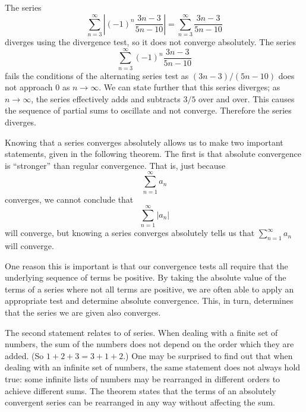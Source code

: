 \documentclass{ximera}
\begin{document}
\begin{question}
\begin{question}
\begin{question}
\begin{prompt}
\begin{selectAll}
        \end{selectAll}
        \begin{feedback}
	  The series
          \[
          \sum_{n=3}^\infty \left|(-1)^n\frac{3n-3}{5n-10}\right| =
          \sum_{n=3}^\infty \frac{3n-3}{5n-10}
          \]
          diverges using the divergence test, so it does not converge
          absolutely.  The series
          \[
          \sum_{n=3}^\infty (-1)^n\frac{3n-3}{5n-10}
          \]
          fails the conditions of the alternating series test as
          $(3n-3)/(5n-10)$ does not approach $0$ as $n\to\infty$. We
          can state further that this series diverges; as
          $n\to\infty$, the series effectively adds and subtracts
          $3/5$ over and over. This causes the sequence of partial
          sums to oscillate and not converge.  Therefore the series
          diverges.
        \end{feedback}
      \end{prompt}
    \end{question}
  \end{question}
\end{question}

Knowing that a series converges absolutely allows us to make two
important statements, given in the following theorem. The first is
that absolute convergence is ``stronger'' than regular
convergence. That is, just because
\[
\sum_{n=1}^\infty a_n
\]
converges, we cannot conclude that
\[
\sum_{n=1}^\infty |a_n|
\]
will converge, but knowing a series converges absolutely tells us that
$\sum_{n=1}^\infty a_n$ will converge.

One reason this is important is that our convergence tests all require
that the underlying sequence of terms be positive. By taking the
absolute value of the terms of a series where not all terms are
positive, we are often able to apply an appropriate test and determine
absolute convergence. This, in turn, determines that the series we are
given also converges.

The second statement relates to  of series. When
dealing with a finite set of numbers, the sum of the numbers does not
depend on the order which they are added. (So $1+2+3 = 3+1+2$.) One
may be surprised to find out that when dealing with an infinite set of
numbers, the same statement does not always hold true: some infinite
lists of numbers may be rearranged in different orders to achieve
different sums. The theorem states that the terms of an absolutely
convergent series can be rearranged in any way without affecting the
sum.
\end{document}
